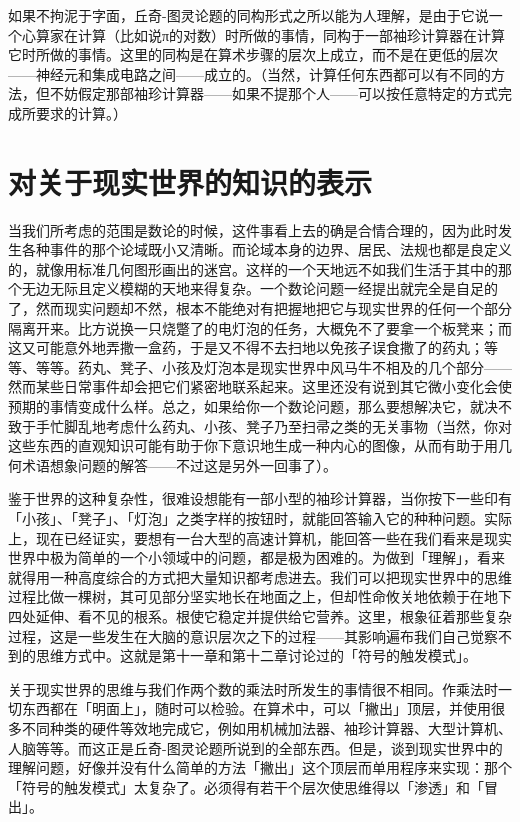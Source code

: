 \documentclass[
  12pt,
  twoside,
  openright,
  oldfontcommands,
]{memoir}
\begin{document}
如果不拘泥于字面，丘奇-图灵论题的同构形式之所以能为人理解，是由于它说一个心算家在计算（比如说π的对数）时所做的事情，同构于一部袖珍计算器在计算它时所做的事情。这里的同构是在算术步骤的层次上成立，而不是在更低的层次------神经元和集成电路之间------成立的。（当然，计算任何东西都可以有不同的方法，但不妨假定那部袖珍计算器------如果不提那个人------可以按任意特定的方式完成所要求的计算。）

\section{对关于现实世界的知识的表示}

当我们所考虑的范围是数论的时候，这件事看上去的确是合情合理的，因为此时发生各种事件的那个论域既小又清晰。而论域本身的边界、居民、法规也都是良定义的，就像用标准几何图形画出的迷宫。这样的一个天地远不如我们生活于其中的那个无边无际且定义模糊的天地来得复杂。一个数论问题一经提出就完全是自足的了，然而现实问题却不然，根本不能绝对有把握地把它与现实世界的任何一个部分隔离开来。比方说换一只烧蹩了的电灯泡的任务，大概免不了要拿一个板凳来；而这又可能意外地弄撒一盒药，于是又不得不去扫地以免孩子误食撒了的药丸；等等、等等。药丸、凳子、小孩及灯泡本是现实世界中风马牛不相及的几个部分------然而某些日常事件却会把它们紧密地联系起来。这里还没有说到其它微小变化会使预期的事情变成什么样。总之，如果给你一个数论问题，那么要想解决它，就决不致于手忙脚乱地考虑什么药丸、小孩、凳子乃至扫帚之类的无关事物（当然，你对这些东西的直观知识可能有助于你下意识地生成一种内心的图像，从而有助于用几何术语想象问题的解答------不过这是另外一回事了）。

鉴于世界的这种复杂性，很难设想能有一部小型的袖珍计算器，当你按下一些印有「小孩」、「凳子」、「灯泡」之类字样的按钮时，就能回答输入它的种种问题。实际上，现在已经证实，要想有一台大型的高速计算机，能回答一些在我们看来是现实世界中极为简单的一个小领域中的问题，都是极为困难的。为做到「理解」，看来就得用一种高度综合的方式把大量知识都考虑进去。我们可以把现实世界中的思维过程比做一棵树，其可见部分坚实地长在地面之上，但却性命攸关地依赖于在地下四处延伸、看不见的根系。根使它稳定并提供给它营养。这里，根象征着那些复杂过程，这是一些发生在大脑的意识层次之下的过程------其影响遍布我们自己觉察不到的思维方式中。这就是第十一章和第十二章讨论过的「符号的触发模式」。

关于现实世界的思维与我们作两个数的乘法时所发生的事情很不相同。作乘法时一切东西都在「明面上」，随时可以检验。在算术中，可以「撇出」顶层，并使用很多不同种类的硬件等效地完成它，例如用机械加法器、袖珍计算器、大型计算机、人脑等等。而这正是丘奇-图灵论题所说到的全部东西。但是，谈到现实世界中的理解问题，好像并没有什么简单的方法「撇出」这个顶层而单用程序来实现：那个「符号的触发模式」太复杂了。必须得有若干个层次使思维得以「渗透」和「冒出」。
\end{document}
